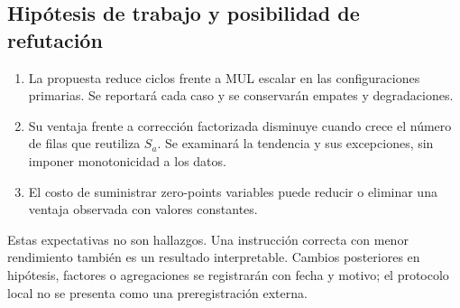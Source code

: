 \subsection{Hipótesis de trabajo y posibilidad de refutación}
\begin{enumerate}[label=H\arabic*.]
\item La propuesta reduce ciclos frente a MUL escalar en las configuraciones
primarias. Se reportará cada caso y se conservarán empates y degradaciones.
\item Su ventaja frente a corrección factorizada disminuye cuando crece el
número de filas que reutiliza \(S_a\). Se examinará la tendencia y sus excepciones,
sin imponer monotonicidad a los datos.
\item El costo de suministrar zero-points variables puede reducir o eliminar
una ventaja observada con valores constantes.
\end{enumerate}
Estas expectativas no son hallazgos. Una instrucción correcta con menor
rendimiento también es un resultado interpretable. Cambios posteriores en
hipótesis, factores o agregaciones se registrarán con fecha y motivo; el
protocolo local no se presenta como una preregistración externa.
